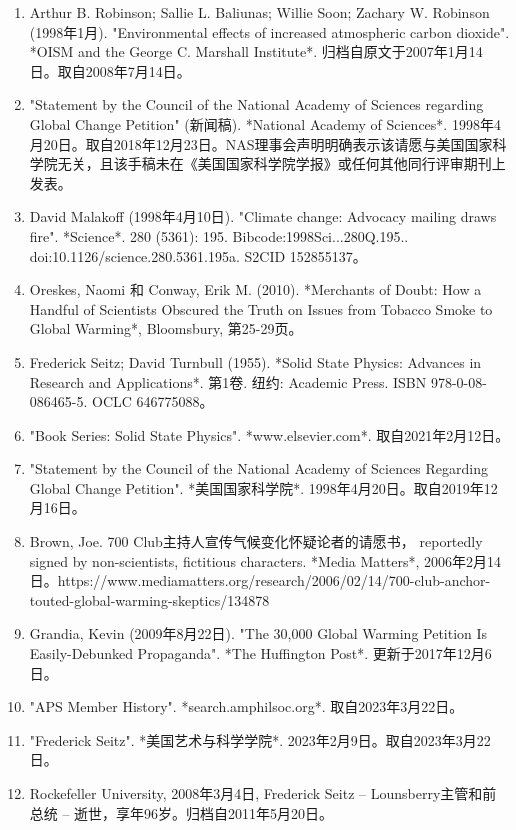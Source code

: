 \begin{enumerate}
\item Arthur B. Robinson; Sallie L. Baliunas; Willie Soon; Zachary W. Robinson (1998年1月). "Environmental effects of increased atmospheric carbon dioxide". *OISM and the George C. Marshall Institute*. 归档自原文于2007年1月14日。取自2008年7月14日。
\item "Statement by the Council of the National Academy of Sciences regarding Global Change Petition" (新闻稿). *National Academy of Sciences*. 1998年4月20日。取自2018年12月23日。NAS理事会声明明确表示该请愿与美国国家科学院无关，且该手稿未在《美国国家科学院学报》或任何其他同行评审期刊上发表。
\item David Malakoff (1998年4月10日). "Climate change: Advocacy mailing draws fire". *Science*. 280 (5361): 195. Bibcode:1998Sci...280Q.195.. doi:10.1126/science.280.5361.195a. S2CID 152855137。
\item Oreskes, Naomi 和 Conway, Erik M. (2010). *Merchants of Doubt: How a Handful of Scientists Obscured the Truth on Issues from Tobacco Smoke to Global Warming*, Bloomsbury, 第25-29页。
\item Frederick Seitz; David Turnbull (1955). *Solid State Physics: Advances in Research and Applications*. 第1卷. 纽约: Academic Press. ISBN 978-0-08-086465-5. OCLC 646775088。
\item "Book Series: Solid State Physics". *www.elsevier.com*. 取自2021年2月12日。
\item "Statement by the Council of the National Academy of Sciences Regarding Global Change Petition". *美国国家科学院*. 1998年4月20日。取自2019年12月16日。
\item Brown, Joe. 700 Club主持人宣传气候变化怀疑论者的请愿书， reportedly signed by non-scientists, fictitious characters. *Media Matters*, 2006年2月14日。https://www.mediamatters.org/research/2006/02/14/700-club-anchor-touted-global-warming-skeptics/134878
\item Grandia, Kevin (2009年8月22日). "The 30,000 Global Warming Petition Is Easily-Debunked Propaganda". *The Huffington Post*. 更新于2017年12月6日。
\item "APS Member History". *search.amphilsoc.org*. 取自2023年3月22日。
\item "Frederick Seitz". *美国艺术与科学学院*. 2023年2月9日。取自2023年3月22日。
\item Rockefeller University, 2008年3月4日, Frederick Seitz – Lounsberry主管和前总统 – 逝世，享年96岁。归档自2011年5月20日。
\end{enumerate}